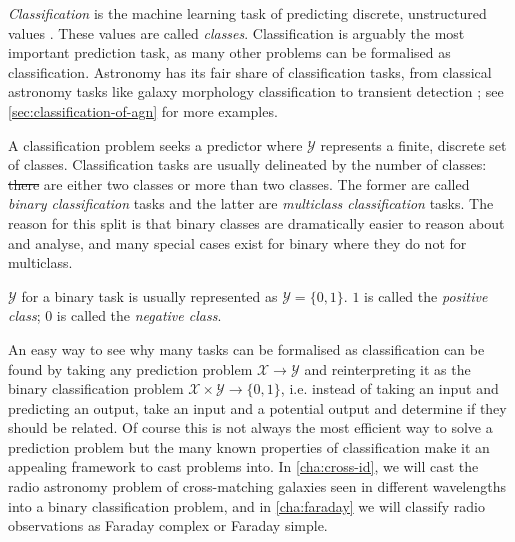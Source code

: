 \documentclass[11pt, a4paper]{book}
\newcommand{\defn}[1]{\emph{#1}}
\providecommand{\DIFaddtex}[1]{{\protect\color{blue}\uwave{#1}}} %
\providecommand{\DIFdeltex}[1]{{\protect\color{red}\sout{#1}}}                      %
\providecommand{\DIFaddbegin}{} %
\providecommand{\DIFaddend}{} %
\providecommand{\DIFdelbegin}{} %
\providecommand{\DIFdelend}{} %
\providecommand{\DIFadd}[1]{\texorpdfstring{\DIFaddtex{#1}}{#1}} %
\providecommand{\DIFdel}[1]{\texorpdfstring{\DIFdeltex{#1}}{}} %
\newcommand{\DIFscaledelfig}{0.5}
\newlength{\DIFdelgraphicswidth} %
\newlength{\DIFdelgraphicsheight} %
\newcommand{\DIFaddincludegraphics}[2][]{{\color{blue}\fbox{\DIFOincludegraphics[#1]{#2}}}} %
\newcommand{\DIFdelincludegraphics}[2][]{%
\sbox{\DIFdelgraphicsbox}{\DIFOincludegraphics[#1]{#2}}%
\settoboxwidth{\DIFdelgraphicswidth}{\DIFdelgraphicsbox} %
\settoboxtotalheight{\DIFdelgraphicsheight}{\DIFdelgraphicsbox} %
\scalebox{\DIFscaledelfig}{%
\parbox[b]{\DIFdelgraphicswidth}{\usebox{\DIFdelgraphicsbox}\\[-\baselineskip] \rule{\DIFdelgraphicswidth}{0em}}\llap{\resizebox{\DIFdelgraphicswidth}{\DIFdelgraphicsheight}{%
\setlength{\unitlength}{\DIFdelgraphicswidth}%
\begin{picture}(1,1)%
\thicklines\linethickness{2pt} %
{\color[rgb]{1,0,0}\put(0,0){\framebox(1,1){}}}%
{\color[rgb]{1,0,0}\put(0,0){\line( 1,1){1}}}%
{\color[rgb]{1,0,0}\put(0,1){\line(1,-1){1}}}%
\end{picture}%
}\hspace*{3pt}}} %
} %
\DeclareRobustCommand{\DIFaddbegin}{\DIFOaddbegin \let\includegraphics\DIFaddincludegraphics} %
\DeclareRobustCommand{\DIFaddend}{\DIFOaddend \let\includegraphics\DIFOincludegraphics} %
\DeclareRobustCommand{\DIFdelbegin}{\DIFOdelbegin \let\includegraphics\DIFdelincludegraphics} %
\DeclareRobustCommand{\DIFdelend}{\DIFOaddend \let\includegraphics\DIFOincludegraphics} %
\begin{document}
        \defn{Classification} is the machine learning task of predicting discrete, unstructured values \citep{deisenroth_mathematics_2020}. These values are called \defn{classes}. Classification is arguably the most important prediction task, as many other problems can be formalised as classification. Astronomy has its fair share of classification tasks, from classical astronomy tasks like galaxy morphology classification \citep[appearing in machine learning literature as e.g.][]{dieleman15cnn} to transient detection \citep[e.g.][]{scalzo_skymapper_2017}; see \autoref{sec:classification-of-agn} for more examples.

        A classification problem seeks a predictor where $\mathcal Y$ represents a finite, discrete set of classes. Classification tasks are usually delineated by the number of classes: \DIFdelbegin \DIFdel{there }\DIFdelend \DIFaddbegin \DIFadd{There }\DIFaddend are either two classes or more than two classes. The former are called \defn{binary classification} tasks and the latter are \defn{multiclass classification} tasks. The reason for this split is that binary classes are dramatically easier to reason about and analyse, and many special cases exist for binary where they do not for multiclass.

        $\mathcal Y$ for a binary task is usually represented as $\mathcal Y = \{0, 1\}$. $1$ is called the \defn{positive class}; $0$ is called the \defn{negative class}.

        An easy way to see why many tasks can be formalised as classification can be found by taking any prediction problem $\mathcal X \to \mathcal Y$ and reinterpreting it as the binary classification problem $\mathcal X \times \mathcal Y \to \{0, 1\}$, i.e. instead of taking an input and predicting an output, take an input and a potential output and determine if they should be related. Of course this is not always the most efficient way to solve a prediction problem but the many known properties of classification make it an appealing framework to cast problems into. In \autoref{cha:cross-id}, we will cast the radio astronomy problem of cross-matching galaxies seen in different wavelengths into a binary classification problem, and in \autoref{cha:faraday} we will classify radio observations as Faraday complex or Faraday simple.
\end{document}
